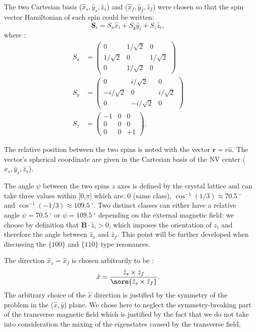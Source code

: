 \documentclass[a4paper, 11pt]{report}
\begin{document}
The two Cartesian basis ($\hat x_s,\hat y_s,\hat z_s$) and ($\hat x_f,\hat y_f,\hat z_f$) were chosen so that the spin vector Hamiltonian of each spin could be written:
\begin{equation}
\mathbf{S}_i=S_x \hat x_i + S_y \hat{y}_i + S_z \hat{z}_i,
\end{equation}
where :
\begin{align*}
S_x&=\begin{pmatrix}
0&1/\sqrt{2}&0 \\
1/\sqrt{2}&0&1/\sqrt{2} \\
0&1/\sqrt{2}&0
\end{pmatrix} \\
S_y&=\begin{pmatrix}
0&i/\sqrt{2}&0 \\
-i/\sqrt{2}&0&i/\sqrt{2} \\
0&-i/\sqrt{2}&0
\end{pmatrix} \\
S_z&=\begin{pmatrix}
-1&0&0 \\
0&0&0 \\
0&0&+1
\end{pmatrix}.
\end{align*}

The relative position between the two spins is noted with the vector $\mathbf{r}=r\hat{u}$. The vector's spherical coordinate are given in the Cartesian basis of the NV center ($\hat x_s,\hat y_s,\hat z_s$).

The angle $\psi$ between the two spins $z$ axes is defined by the crystal lattice and can take three values within [0,$\pi$] which are: 0 (same class), $\cos^{-1}(1/3) \approx 70.5\ ^\circ$ and $\cos^{-1}(-1/3) \approx 109.5\ ^\circ$. Two distinct classes can either have a relative angle $\psi=70.5 \ ^\circ$ or $\psi=109.5 \ ^\circ$ depending on the external magnetic field: we choose by definition that $\mathbf{B}\cdot\hat{z}_i >0$, which imposes the orientation of $z_i$ and therefore the angle between $\hat z_s$ and $\hat z_f$. This point will be further developed when discussing the $\{100\}$ and $\{110\}$ type resonances.

The direction $\hat x_s=\hat x_f$ is chosen arbitrarily to be : $$\hat x=\frac{\hat z_s \times \hat z_f}{\norm{\hat z_s \times \hat z_f}}.$$
The arbitrary choice of the $\hat x$ direction is justified by the symmetry of the problem in the ($\hat x, \hat y$) plane. We chose here to neglect the symmetry-breaking part of the transverse magnetic field which is justified by the fact that we do not take into consideration the mixing of the eigenstates caused by the transverse field.
\end{document}
